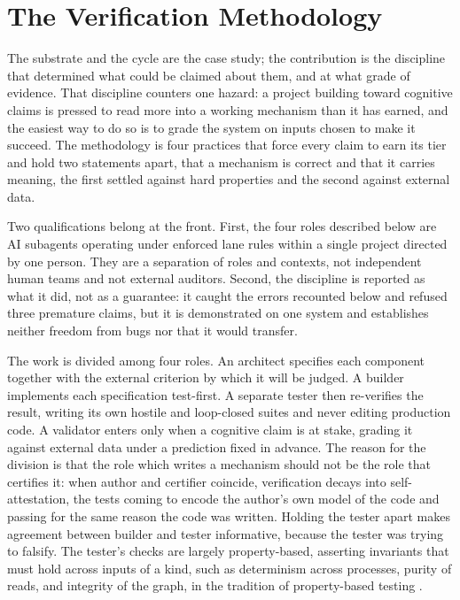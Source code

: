 \documentclass[conference]{IEEEtran}
\begin{document}
\section{The Verification Methodology}\label{sec:methodology}
The substrate and the cycle are the case study; the contribution is the discipline that
determined what could be claimed about them, and at what grade of evidence. That discipline
counters one hazard: a project building toward cognitive claims is pressed to read more into
a working mechanism than it has earned, and the easiest way to do so is to grade the system
on inputs chosen to make it succeed. The methodology is four practices that force every claim
to earn its tier and hold two statements apart, that a mechanism is correct and that it
carries meaning, the first settled against hard properties and the second against external
data.

Two qualifications belong at the front. First, the four roles described below are AI
subagents operating under enforced lane rules within a single project directed by one person.
They are a separation of roles and contexts, not independent human teams and not external
auditors. Second, the discipline is reported as what it did, not as a guarantee: it caught
the errors recounted below and refused three premature claims, but it is demonstrated on one
system and establishes neither freedom from bugs nor that it would transfer.

The work is divided among four roles. An architect specifies each component together with the
external criterion by which it will be judged. A builder implements each specification
test-first. A separate tester then re-verifies the result, writing its own hostile and
loop-closed suites and never editing production code. A validator enters only when a
cognitive claim is at stake, grading it against external data under a prediction fixed in
advance. The reason for the division is that the role which writes a mechanism should not be
the role that certifies it: when author and certifier coincide, verification decays into
self-attestation, the tests coming to encode the author's own model of the code and passing
for the same reason the code was written. Holding the tester apart makes agreement between
builder and tester informative, because the tester was trying to falsify. The tester's checks
are largely property-based, asserting invariants that must hold across inputs of a kind, such
as determinism across processes, purity of reads, and integrity of the graph, in the
tradition of property-based testing \cite{claessen2000quickcheck, maciver2019hypothesis}.
\end{document}
